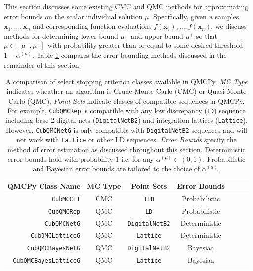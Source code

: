 \documentclass[graybox]{svmult}
\begin{document}
This section discusses some existing CMC and QMC methods for approximating error bounds on the scalar individual solution $\mu$. Specifically, given $n$ samples $\boldsymbol{x}_1,\dots,\boldsymbol{x}_n$ and corresponding function evaluations $f(\boldsymbol{x}_1),\dots,f(\boldsymbol{x}_n)$, we discuss methods for determining lower bound $\mu^-$ and upper bound $\mu^+$ so that $\mu \in [\mu^-,\mu^+]$ with probability greater than or equal to some desired threshold $1-\alpha^{(\mu)}$. Table \ref{table:qmcpy_sc} compares the error bounding methods discussed in the remainder of this section.

\begin{table}[t]
\centering
\begin{tabular}{r c c c c c c}
    QMCPy Class Name & MC Type & Point Sets & Error Bounds \\
    \hline
    \texttt{CubMCCLT} \cite{cubmcg} & CMC & \texttt{IID} & Probabilistic \\
    \texttt{CubQMCRep} \cite{mcbook} & QMC & \texttt{LD} & Probabilistic \\
    \texttt{CubQMCNetG} \cite{cubqmcsobol} & QMC & \texttt{DigitalNetB2} & Deterministic \\
    \texttt{CubQMCLatticeG} \cite{cubqmclattice} & QMC & \texttt{Lattice} & Deterministic \\
    \texttt{CubQMCBayesNetG} \cite{cubqmcbayes_thesis} & QMC &  \texttt{DigitalNetB2} & Bayesian \\
    \texttt{CubQMCBayesLatticeG} \cite{cubqmcbayeslattice} & QMC & \texttt{Lattice} & Bayesian \\
    \hline
\end{tabular}
\caption{A comparison of select stopping criterion classes available in QMCPy. \emph{MC Type} indicates wheather an algorithm is Crude Monte Carlo (CMC) or Quasi-Monte Carlo (QMC). \emph{Point Sets} indicate classes of compatible sequences in QMCPy. For example, \texttt{CubQMCRep} is compatible with any low discrepancy (\texttt{LD}) sequence including base 2 digital nets (\texttt{DigitalNetB2}) and integration lattices (\texttt{Lattice}). However, \texttt{CubQMCNetG} is only compatible with \texttt{DigitalNetB2} sequences and will not work with \texttt{Lattice} or other LD sequences. \emph{Error Bounds} specify the method of error estimation as discussed throughout this section. Deterministic error bounds hold with probability $1$ i.e. for any $\alpha^{(\mu)} \in (0,1)$. Probabilistic and Bayesian error bounds are tailored to the choice of $\alpha^{(\mu)}$.}
\label{table:qmcpy_sc}
\end{table}
\end{document}
